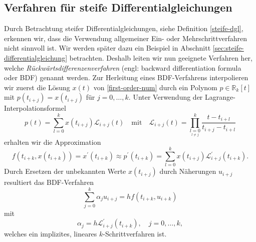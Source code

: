 \subsection{Verfahren für steife Differentialgleichungen}
Durch Betrachtung steifer Differentialgleichungen, siehe Definition \ref{steife-dgl}, erkennen wir, dass
die Verwendung allgemeiner Ein- oder Mehrschrittverfahren nicht sinnvoll ist. Wir werden später dazu ein Beispiel in
Abschnitt \ref{sec:steife-differentialgleichung} betrachten. Deshalb leiten wir nun geeignete Verfahren her, welche
\textit{Rückwärtsdifferenzenverfahren} (engl: backward differentiation formula oder BDF) genannt werden. Zur
Herleitung eines BDF-Verfahrens interpolieren wir zuerst die Lösung $x(t)$ von \eqref{first-order-num} durch ein Polynom
$p \in \mathbb{R}_k[t]$ mit $p(t_{i+j}) = x(t_{i+j})$ für $j=0, \dots, k$. Unter Verwendung der Lagrange-Interpolationsformel
\[
    p(t) = \sum_{l=0}^{k} x(t_{i+j}) \mathcal{L}_{i+j}(t) \quad \text{mit} \quad
    \mathcal{L}_{i+j}(t) = \prod\limits_{\underset{l \neq j}{l=0}}^{k} \frac{t-t_{i+l}}{t_{i+j}-t_{i+l}}
\]
erhalten wir die Approximation
\[
    f(t_{i+k},x(t_{i+k})) = x^{\prime}(t_{i+k}) \approx p^{\prime}(t_{i+k})
    = \sum_{l=0}^{k} x(t_{i+j})\mathcal{L}^{\prime}_{i+j}(t_{i+k}).
\]
Durch Ersetzen der unbekannten Werte $x(t_{i+j})$ durch Näherungen $u_{i+j}$ resultiert das BDF-Verfahren
\[
    \sum_{j=0}^{k}\alpha_j u_{i+j} = h f(t_{i+k}, u_{i+k})
\]
mit
\[
    \alpha_j = h \mathcal{L}^{\prime}_{i+j} (t_{i+k}), \quad j=0,\dots,k,
\]
welches ein implizites, lineares $k$-Schrittverfahren ist.

